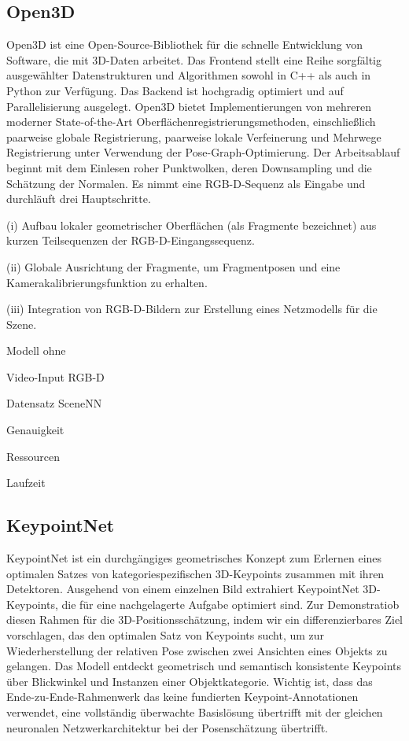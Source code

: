 \documentclass[a4paper, 11pt]{article}
\begin{document}
\begin{multicols*}{2}
    \subsection{Open3D}
    Open3D\cite{ICP} ist eine Open-Source-Bibliothek für die schnelle Entwicklung von Software, die mit 3D-Daten arbeitet.
    Das Frontend stellt eine Reihe sorgfältig ausgewählter Datenstrukturen und Algorithmen sowohl in C++ als auch in Python zur Verfügung. Das Backend ist hochgradig optimiert und auf Parallelisierung ausgelegt.
    Open3D bietet Implementierungen von mehreren moderner State-of-the-Art Oberflächenregistrierungsmethoden, einschließlich paarweise globale Registrierung, paarweise lokale Verfeinerung und Mehrwege Registrierung unter Verwendung der Pose-Graph-Optimierung.
    Der Arbeitsablauf beginnt mit dem Einlesen roher Punktwolken, deren Downsampling und die Schätzung der Normalen.
    Es nimmt eine RGB-D-Sequenz als Eingabe und durchläuft drei Hauptschritte.

    (i) Aufbau lokaler geometrischer Oberflächen (als Fragmente bezeichnet) aus kurzen Teilsequenzen der RGB-D-Eingangssequenz.

    (ii) Globale Ausrichtung der Fragmente, um Fragmentposen und eine Kamerakalibrierungsfunktion zu erhalten.

    (iii) Integration von RGB-D-Bildern zur Erstellung eines Netzmodells für die Szene.

    \begin{description*}
        \item[Modell] ohne
        \item[Video-Input] RGB-D
        \item[Datensatz] SceneNN\cite{scenenn}
        \item[Genauigkeit]
        \item[Ressourcen]
        \item[Laufzeit]
    \end{description*}

    \subsection{KeypointNet}
    KeypointNet\cite{KeypointNet} ist ein durchgängiges geometrisches Konzept zum Erlernen eines optimalen Satzes von kategoriespezifischen 3D-Keypoints zusammen mit ihren Detektoren. Ausgehend von einem einzelnen Bild extrahiert KeypointNet 3D-Keypoints, die für eine nachgelagerte Aufgabe optimiert sind.
    Zur Demonstratiob diesen Rahmen für die 3D-Positionsschätzung, indem wir ein differenzierbares Ziel vorschlagen, das den optimalen Satz von Keypoints sucht, um zur Wiederherstellung der relativen Pose zwischen zwei Ansichten eines Objekts zu gelangen. Das Modell entdeckt geometrisch und semantisch konsistente Keypoints über Blickwinkel und Instanzen einer Objektkategorie. Wichtig ist, dass das Ende-zu-Ende-Rahmenwerk das keine fundierten Keypoint-Annotationen verwendet, eine vollständig überwachte Basislösung übertrifft mit der gleichen neuronalen Netzwerkarchitektur bei der Posenschätzung übertrifft.


\end{multicols*}
\end{document}
